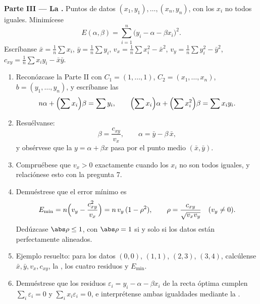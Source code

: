 \begin{problem}
\medskip
\noindent\textbf{Parte III --- La .} Puntos de datos
$(x_1, y_1), \dots, (x_n, y_n)$, con los $x_i$ no todos iguales. Minimícese
\[
E(\alpha, \beta) = \sum_{i=1}^{n}\bigl(y_i - \alpha - \beta
x_i\bigr)^2 .
\]
Escríbanse $\bar x = \frac1n\sum x_i$, $\bar y = \frac1n\sum y_i$,
$v_x = \frac1n\sum x_i^2 - \bar x^2$, $v_y = \frac1n\sum y_i^2 -
\bar y^2$, $c_{xy} = \frac1n\sum x_i y_i - \bar x\bar y$.
\begin{enumerate}[resume]
  \item Reconózcase la Parte II con $C_1 = (1, \dots, 1)$, $C_2 =
        (x_1, \dots, x_n)$, $b = (y_1, \dots, y_n)$, y escríbanse
        las 
        \[
        n\alpha + \Bigl(\sum x_i\Bigr)\beta = \sum y_i,
        \qquad
        \Bigl(\sum x_i\Bigr)\alpha + \Bigl(\sum
        x_i^2\Bigr)\beta = \sum x_i y_i .
        \]
  \item Resuélvanse:
        \[
        \beta = \frac{c_{xy}}{v_x},
        \qquad
        \alpha = \bar y - \beta\,\bar x ,
        \]
        y obsérvese que la \emph{} $y = \alpha
        + \beta x$ pasa por el punto medio $(\bar x, \bar
        y)$.
  \item Compruébese que $v_x > 0$ exactamente cuando los $x_i$ no son
        todos iguales, y relaciónese esto con la pregunta 7.
  \item Demuéstrese que el error mínimo es
        \[
        E_{\min} = n\Bigl(v_y - \frac{c_{xy}^2}{v_x}\Bigr)
        = n\,v_y\,(1 - \rho^2),
        \qquad
        \rho = \frac{c_{xy}}{\sqrt{v_x v_y}}
        \quad (v_y \neq 0).
        \]
        Dedúzcase $\abs\rho \leq 1$, con $\abs\rho = 1$ si y solo
        si los datos están perfectamente alineados.
  \item Ejemplo resuelto: para los datos $(0,0)$, $(1,1)$, $(2,3)$,
        $(3,4)$, calcúlense $\bar x, \bar y, v_x, c_{xy}$, la
        , los cuatro residuos y $E_{\min}$.
  \item Demuéstrese que los residuos $\varepsilon_i = y_i - \alpha -
        \beta x_i$ de la recta óptima cumplen $\sum_i
        \varepsilon_i = 0$ y $\sum_i x_i\varepsilon_i = 0$,
        e interprétense ambas igualdades mediante la .
\end{enumerate}


\end{problem}
